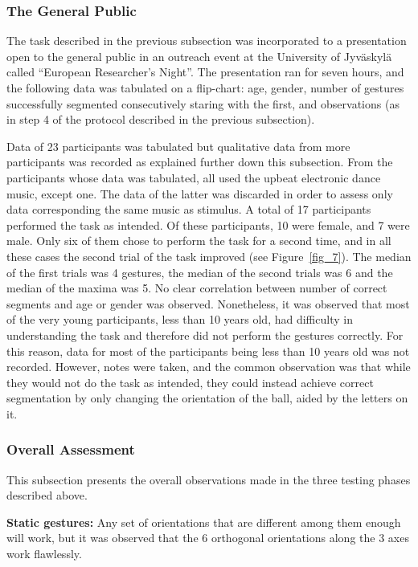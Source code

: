 \documentclass{nime-alternate_MANUSCRIPT} %
\begin{document}
\subsubsection{The General Public}

The task described in the previous subsection was incorporated to a presentation open to the general public in an outreach event at the 
University of Jyväskylä called “European Researcher’s Night”. 
The presentation ran for seven hours, and the following data was tabulated on a flip-chart: age, gender, number of gestures successfully segmented consecutively staring with the first, and observations (as in step 4 of the protocol described in the previous subsection).

Data of 23 participants was tabulated but qualitative data from more participants was recorded as explained further down this subsection. From the participants whose data was tabulated, all used the upbeat electronic dance music, except one. The data of the latter was discarded in order to assess only data corresponding the same music as stimulus. A total of 17 participants performed the task as intended. Of these participants, 10 were female, and 7 were male. Only six of them chose to perform the task for a second time, and in all these cases the second trial of the task improved (see Figure~\ref{fig_7}). The median of the first trials was 4 gestures, the median of the second trials was 6 and the median of the maxima was 5. No clear correlation between number of correct segments and age or gender was observed. Nonetheless, it was observed that most of the very young participants, less than 10 years old, had difficulty in understanding the task and therefore did not perform the gestures correctly. For this reason, data for most of the participants being less than 10 years old was not recorded. However, notes were taken, and the common observation was that while they would not do the task as intended, they could instead achieve correct segmentation by only changing the orientation of the ball, aided by the letters on it.

\subsubsection{Overall Assessment}

This subsection presents the overall observations made in the three testing phases described above. 

\textbf{Static gestures:} Any set of orientations that are different among them enough will work, but it was observed that the 6 orthogonal orientations along the 3 axes work flawlessly.
\end{document}
